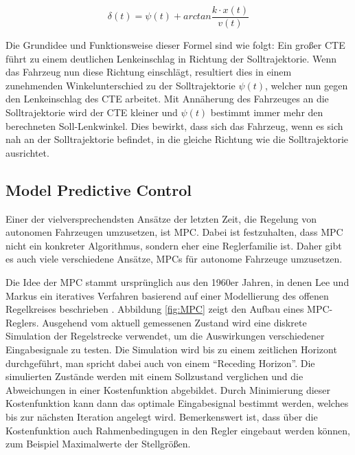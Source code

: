 \begin{equation}
\label{stanley_equation}
\delta(t)=\psi(t)+arctan\frac{k \cdot x(t)}{v(t)}
\end{equation}

Die Grundidee und Funktionsweise dieser Formel sind wie folgt: Ein großer \gls{CTE} führt zu einem deutlichen Lenkeinschlag in Richtung der Solltrajektorie. Wenn das Fahrzeug nun diese Richtung einschlägt, resultiert dies in einem zunehmenden Winkelunterschied zu der Solltrajektorie \(\psi(t)\), welcher nun gegen den Lenkeinschlag des \gls{CTE} arbeitet. Mit Annäherung des Fahrzeuges an die Solltrajektorie wird der \gls{CTE} kleiner und \(\psi(t)\) bestimmt immer mehr den berechneten Soll-Lenkwinkel. Dies bewirkt, dass sich das Fahrzeug, wenn es sich nah an der Solltrajektorie befindet, in die gleiche Richtung wie die Solltrajektorie ausrichtet.

\subsection{Model Predictive Control}
Einer der vielversprechendsten Ansätze der letzten Zeit, die Regelung von autonomen Fahrzeugen umzusetzen, ist \gls{MPC}.
Dabei ist festzuhalten, dass \gls{MPC} nicht ein konkreter Algorithmus, sondern eher eine Reglerfamilie ist.
Daher gibt es auch viele verschiedene Ansätze, \glspl{MPC} für autonome Fahrzeuge umzusetzen.

Die Idee der \gls{MPC} stammt ursprünglich aus den 1960er Jahren, in denen Lee und Markus ein iteratives Verfahren basierend auf einer Modellierung des offenen Regelkreises beschrieben \cite{lee1967foundations}.
Abbildung \ref{fig:MPC} zeigt den Aufbau eines \gls{MPC}-Reglers.
Ausgehend vom aktuell gemessenen Zustand wird eine diskrete Simulation der Regelstrecke verwendet, um die Auswirkungen verschiedener Eingabesignale zu testen.
Die Simulation wird bis zu einem zeitlichen Horizont durchgeführt, man spricht dabei auch von einem \enquote{Receding Horizon}.
Die simulierten Zustände werden mit einem Sollzustand verglichen und die Abweichungen in einer Kostenfunktion abgebildet.
Durch Minimierung dieser Kostenfunktion kann dann das optimale Eingabesignal bestimmt werden, welches bis zur nächsten Iteration angelegt wird.
Bemerkenswert ist, dass über die Kostenfunktion auch Rahmenbedingugen in den Regler eingebaut werden können, zum Beispiel Maximalwerte der Stellgrößen.


